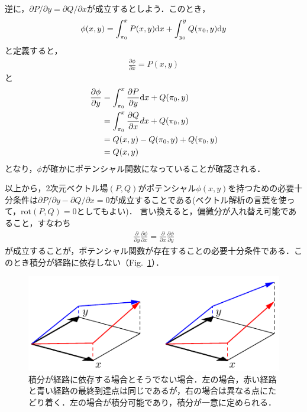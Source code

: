 \documentclass[a4j,10pt]{jsarticle}
\begin{document}
逆に，$\partial P/\partial y = \partial Q /\partial x$が成立するとしよう．このとき，
\begin{align}
    \phi(x,y) = \int_{\pi_0}^x P(x,y){\rm d} x + \int_{y_0}^y Q(\pi_0,y){\rm d} y
\end{align}
と定義すると，
\begin{align*}
    \frac{\partial \phi}{\partial x} = P(x,y)
\end{align*}
と
\begin{align*}
    \frac{\partial \phi}{\partial y}&=\int_{\pi_0}^x \frac{\partial P}{\partial y}{\rm d} x + Q(\pi_0,y)\\
    &=\int_{\pi_0}^x \frac{\partial Q}{\partial x}dx + Q(\pi_0,y)\\
    &= Q(x,y) - Q(\pi_0, y) + Q(\pi_0,y)\\
    &= Q(x,y)
\end{align*}
となり，$\phi$が確かにポテンシャル関数になっていることが確認される．

以上から，2次元ベクトル場$(P,Q)$がポテンシャル$\phi(x,y)$を持つための必要十分条件は$\partial P/\partial y - \partial Q /\partial x=0$が成立することである(ベクトル解析の言葉を使って，${\mathrm{rot}(P,Q)=0}$としてもよい)．
言い換えると，偏微分が入れ替え可能であること，すなわち
\begin{align}
    \frac{\partial}{\partial y}\frac{\partial \phi}{\partial x}=\frac{\partial}{\partial x}\frac{\partial \phi}{\partial y}
\end{align}
が成立することが，ポテンシャル関数が存在することの必要十分条件である．このとき積分が経路に依存しない（Fig.~\ref{fig:integral_path}）．

\begin{figure}
    \centering
    \includegraphics{integral_path.pdf}
    \caption{積分が経路に依存する場合とそうでない場合．左の場合，赤い経路と青い経路の最終到達点は同じであるが，右の場合は異なる点にたどり着く．左の場合が積分可能であり，積分が一意に定められる．}
    \label{fig:integral_path}
\end{figure}
\end{document}
